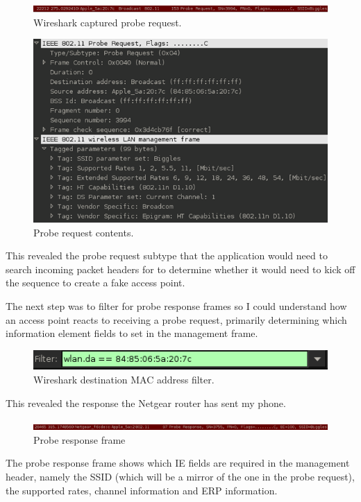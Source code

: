 \begin{figure}[h!]
\includegraphics[width=\linewidth]{research/80211/figures/bt3.png}
\caption{Wireshark captured probe request.}
\label{research:80211:bt3}
\end{figure}

\begin{figure}[h!]
\includegraphics[width=\linewidth]{research/80211/figures/bt4.png}
\caption{Probe request contents.}
\label{research:80211:bt4}
\end{figure}
\newpage
This revealed the probe request subtype that the application would need to search incoming packet headers for to determine whether it would need to kick off the sequence to create a fake access point.

The next step was to filter for probe response frames so I could understand how an access point reacts to receiving a probe request, primarily determining which information element fields to set in the management frame.

\begin{figure}[h!]
\includegraphics[width=\linewidth]{research/80211/figures/bt5.png}
\caption{Wireshark destination MAC address filter.}
\label{research:80211:bt5}
\end{figure}

This revealed the response the Netgear router has sent my phone.

\begin{figure}[h!]
\includegraphics[width=\linewidth]{research/80211/figures/bt6.png}
\caption{Probe response frame}
\label{research:80211:bt6}
\end{figure}
\newpage
The probe response frame shows which IE fields are required in the management header, namely the SSID (which will be a mirror of the one in the probe request), the supported rates, channel information and ERP information. 

